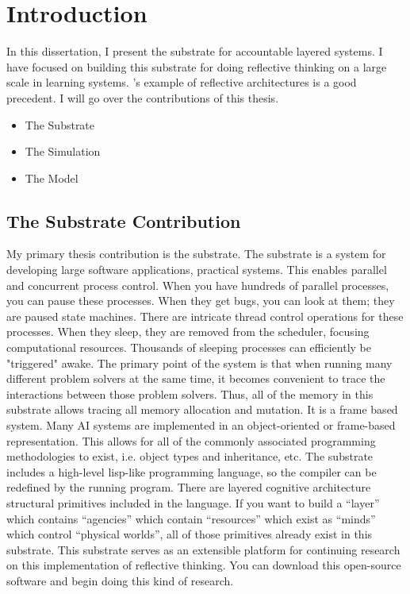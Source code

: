 \chapter{Introduction}
\label{chapter:introduction}

In this dissertation, I present the substrate for accountable layered systems.
I have focused on building this substrate for doing reflective thinking on a large scale in learning systems.  \cite{singh:2005}'s example of reflective architectures is a good precedent.
I will go over the contributions of this thesis.

\begin{itemize}
\item The Substrate
\item The Simulation
\item The Model
\end{itemize}
  
\section{The Substrate Contribution}

My primary thesis contribution is the substrate.  The substrate is a
system for developing large software applications, practical systems.
This enables parallel and concurrent process control.  When you have
hundreds of parallel processes, you can pause these processes.  When
they get bugs, you can look at them; they are paused state machines.
There are intricate thread control operations for these processes.
When they sleep, they are removed from the scheduler, focusing
computational resources.  Thousands of sleeping processes can
efficiently be "triggered" awake.  The primary point of the system is
that when running many different problem solvers at the same time, it
becomes convenient to trace the interactions between those problem
solvers.  Thus, all of the memory in this substrate allows tracing all
memory allocation and mutation.  It is a frame based system.  Many AI
systems are implemented in an object-oriented or frame-based
representation.  This allows for all of the commonly associated
programming methodologies to exist, i.e.  object types and
inheritance, etc.  The substrate includes a high-level lisp-like
programming language, so the compiler can be redefined by the running
program.  There are layered cognitive architecture structural
primitives included in the language.  If you want to build a ``layer''
which contains ``agencies'' which contain ``resources'' which exist as
``minds'' which control ``physical worlds'', all of those primitives
already exist in this substrate.  This substrate serves as an
extensible platform for continuing research on this implementation of
reflective thinking.  You can download this open-source software and
begin doing this kind of research.

